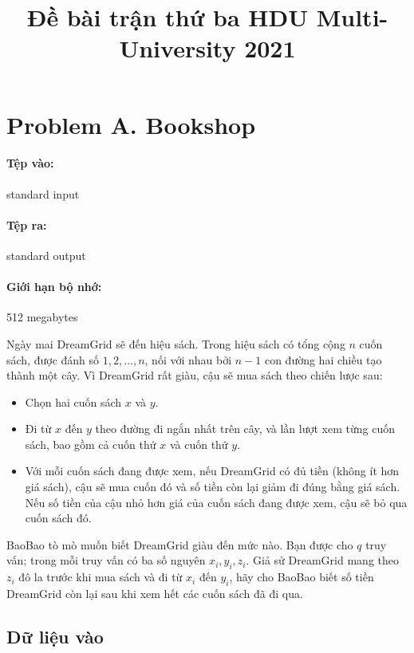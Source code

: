 \documentclass[11pt]{article}
\title{Đề bài trận thứ ba HDU Multi-University 2021}
\author{}
\date{}
\begin{document}
\maketitle


\section{Problem A. Bookshop}

\paragraph{Tệp vào:} standard input
\paragraph{Tệp ra:} standard output
\paragraph{Giới hạn bộ nhớ:} 512 megabytes

Ngày mai DreamGrid sẽ đến hiệu sách. Trong hiệu sách có tổng cộng \(n\) cuốn
sách, được đánh số \(1,2,\ldots,n\), nối với nhau bởi \(n-1\) con đường hai
chiều tạo thành một cây. Vì DreamGrid rất giàu, cậu sẽ mua sách theo chiến
lược sau:
\begin{itemize}
  \item Chọn hai cuốn sách \(x\) và \(y\).
  \item Đi từ \(x\) đến \(y\) theo đường đi ngắn nhất trên cây, và lần lượt
  xem từng cuốn sách, bao gồm cả cuốn thứ \(x\) và cuốn thứ \(y\).
  \item Với mỗi cuốn sách đang được xem, nếu DreamGrid có đủ tiền (không ít
  hơn giá sách), cậu sẽ mua cuốn đó và số tiền còn lại giảm đi đúng bằng giá
  sách. Nếu số tiền của cậu nhỏ hơn giá của cuốn sách đang được xem, cậu sẽ
  bỏ qua cuốn sách đó.
\end{itemize}

BaoBao tò mò muốn biết DreamGrid giàu đến mức nào. Bạn được cho \(q\) truy
vấn; trong mỗi truy vấn có ba số nguyên \(x_i,y_i,z_i\). Giả sử DreamGrid
mang theo \(z_i\) đô la trước khi mua sách và đi từ \(x_i\) đến \(y_i\), hãy
cho BaoBao biết số tiền DreamGrid còn lại sau khi xem hết các cuốn sách đã
đi qua.

\subsection*{Dữ liệu vào}
\end{document}
